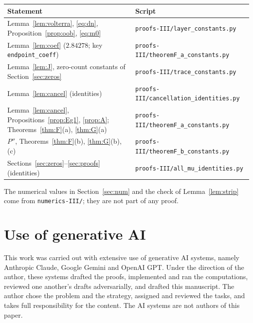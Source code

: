 \documentclass[11pt]{amsart}
\theoremstyle{remark}
\numberwithin{equation}{section}
\begin{document}
\begin{center}\small
\begin{tabular}{ll}
\toprule
Statement & Script\\
\midrule
Lemma~\ref{lem:volterra}, \eqref{eq:dn}, Proposition~\ref{prop:oob}, \eqref{eq:m0} & \texttt{proofs-III/layer\_constants.py}\\
Lemma~\ref{lem:coef} ($2.84278$; key \texttt{endpoint\_coeff}) & \texttt{proofs-III/theoremF\_a\_constants.py}\\
Lemma~\ref{lem:J}, zero-count constants of Section~\ref{sec:zeros} & \texttt{proofs-III/trace\_constants.py}\\
Lemma~\ref{lem:cancel} (identities) & \texttt{proofs-III/cancellation\_identities.py}\\
Lemma~\ref{lem:cancel}, Propositions~\ref{prop:Eg1}, \ref{prop:A}; Theorems~\ref{thm:F}(a), \ref{thm:G}(a) & \texttt{proofs-III/theoremF\_a\_constants.py}\\
$P''$, Theorems~\ref{thm:F}(b), \ref{thm:G}(b), (c) & \texttt{proofs-III/theoremF\_b\_constants.py}\\
Sections~\ref{sec:zeros}--\ref{sec:proofs} (identities) & \texttt{proofs-III/all\_mu\_identities.py}\\
\bottomrule
\end{tabular}
\end{center}

The numerical values in Section~\ref{sec:num} and the check of Lemma~\ref{lem:strip} come from \texttt{numerics-III/}; they are not part of any proof.

\section*{Use of generative AI}
This work was carried out with extensive use of generative AI systems, namely Anthropic Claude, Google Gemini and OpenAI GPT. Under the direction of the author, these systems drafted the proofs, implemented and ran the computations, reviewed one another's drafts adversarially, and drafted this manuscript. The author chose the problem and the strategy, assigned and reviewed the tasks, and takes full responsibility for the content. The AI systems are not authors of this paper.
\end{document}

